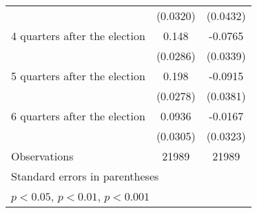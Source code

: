 \begin{table}[htbp]
\begin{tabular}{l*{2}{c}}
                    &    (0.0320)         &    (0.0432)         \\
[1em]
 4 quarters after the election&       0.148\sym{***}&     -0.0765\sym{*}  \\
                    &    (0.0286)         &    (0.0339)         \\
[1em]
 5 quarters after the election&       0.198\sym{***}&     -0.0915\sym{*}  \\
                    &    (0.0278)         &    (0.0381)         \\
[1em]
 6 quarters after the election&      0.0936\sym{**} &     -0.0167         \\
                    &    (0.0305)         &    (0.0323)         \\
\hline
Observations        &       21989         &       21989         \\
\hline\hline
\multicolumn{3}{l}{\footnotesize Standard errors in parentheses}\\
\multicolumn{3}{l}{\footnotesize \sym{*} \(p<0.05\), \sym{**} \(p<0.01\), \sym{***} \(p<0.001\)}\\
\end{tabular}
\end{table}
